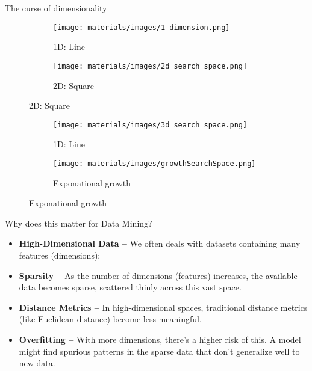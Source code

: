 \documentclass[handout]{beamer}
\begin{document}
\begin{frame}{The curse of dimensionality}

\begin{figure}[h]
    \centering
    \begin{subfigure}{0.4\textwidth}
        \texttt{[image: materials/images/1 dimension.png]}
        \caption{1D: Line}
    \end{subfigure}
    \hfill
    \begin{subfigure}{0.4\textwidth}
        \texttt{[image: materials/images/2d search space.png]}
        \caption{2D: Square}
    \end{subfigure}
    \label{fig:lost_keys}
\end{figure}    
\vspace{-0.5cm}

\begin{figure}[h]
    \centering
    \begin{subfigure}{0.4\textwidth}
        \texttt{[image: materials/images/3d search space.png]}
        \caption{1D: Line}
    \end{subfigure}
    \hfill
    \begin{subfigure}{0.4\textwidth}
        \texttt{[image: materials/images/growthSearchSpace.png]}
        \caption{Exponational growth}
    \end{subfigure}
    \label{fig:lost_keys}
\end{figure}    

\end{frame}

\begin{frame}{Why does this matter for Data Mining?}
\begin{itemize}
\item \textbf{High-Dimensional Data --} We often deals with datasets containing many features (dimensions);
\item \textbf{Sparsity --} As the number of dimensions (features) increases, the available data becomes sparse, scattered thinly across this vast space.
\item \textbf{Distance Metrics --} In high-dimensional spaces, traditional distance metrics (like Euclidean distance) become less meaningful.
\item \textbf{Overfitting --} With more dimensions, there's a higher risk of this.  A model might find spurious patterns in the sparse data that don't generalize well to new data. 
\end{itemize}




\end{frame}
\end{document}
